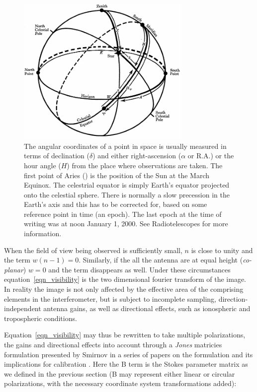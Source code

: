 \documentclass[a4paper,10pt]{report}
\begin{document}
\begin{figure}[h]
 \begin{mdframed}
 \centering
 \includegraphics[width=0.75\textwidth]{images/equatorial_coords.png}
 \caption[Equatorial and alt-azimuth coordinate system]{The angular coordinates of a point in space is usually measured in terms of declination ($\delta$) and either right-ascension ($\alpha$ or R.A.) or the hour angle ($H$) from the place
 where observations are taken. The first point of Aries (\Aries) is the position of the Sun at the March Equinox. The celestrial equator is simply Earth's equator projected onto the celestial sphere. There is normally a slow precession in the Earth's
 axis and this has to be corrected for, based on some reference point in time (an epoch). The last epoch at the time of writing was at noon January 1, 2000. See Radiotelescopes \cite[Appendix 4]{christiansenradiotelescopes} for more information.}
  \label{fig_celestrial_coords}
 \end{mdframed}
\end{figure}

When the field of view being observed is sufficiently small, $n$ is close to unity and the term $w(n-1) = 0$. Similarly, if the all the antenna are at equal height (\textit{co-planar}) $w=0$ and the term disappears as well. Under 
these circumstances equation~\ref{eqn_visibility} is the two dimensional fourier transform of the image. In reality the image is not only affected by the effective area of the comprising elements in the interferometer, but is 
subject to incomplete sampling, direction-independent antenna gains, as well as directional effects, such as ionospheric and tropospheric conditions. 

Equation~\ref{eqn_visibility} may thus be rewritten to take multiple polarizations, the gains and directional effects into account through a \textit{Jones} matricies formulation presented by Smirnov in a series of papers on the 
formulation and its implications for calibration \cite{2011A&A...527A.106S,2011A&A...527A.107S,2011A&A...527A.108S}. Here the B term is the Stokes parameter matrix as we defined in the previous section (B may represent either
linear or circular polarizations, with the necessary coordinate system transformations added):
\end{document}

